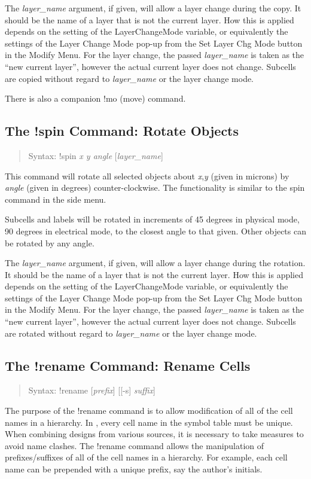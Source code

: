 The {\it layer\_name} argument, if given, will allow a layer change
during the copy.  It should be the name of a layer that is not the
current layer.  How this is applied depends on the setting of the {\et
LayerChangeMode} variable, or equivalently the settings of the {\cb
Layer Change Mode} pop-up from the {\cb Set Layer Chg Mode} button
in the {\cb Modify Menu}.  For the layer change, the passed {\it
layer\_name} is taken as the ``new current layer'', however the actual
current layer does not change.  Subcells are copied without regard to
{\it layer\_name} or the layer change mode.

There is also a companion {\cb !mo} (move) command.

\subsection{The {\cb !spin} Command: Rotate Objects}
\begin{quote}
Syntax: {\vt !spin} {\it x y angle} [{\it layer\_name\/}]
\end{quote}
This command will rotate all selected objects about {\it x\/},{\it y}
(given in microns) by {\it angle} (given in degrees)
counter-clockwise.  The functionality is similar to the {\cb spin}
command in the side menu.

Subcells and labels will be rotated in increments of 45 degrees in
physical mode, 90 degrees in electrical mode, to the closest angle to
that given.  Other objects can be rotated by any angle.

The {\it layer\_name} argument, if given, will allow a layer change
during the rotation.  It should be the name of a layer that is not the
current layer.  How this is applied depends on the setting of the {\et
LayerChangeMode} variable, or equivalently the settings of the {\cb
Layer Change Mode} pop-up from the {\cb Set Layer Chg Mode} button
in the {\cb Modify Menu}.  For the layer change, the passed {\it
layer\_name} is taken as the ``new current layer'', however the actual
current layer does not change.  Subcells are rotated without regard to
{\it layer\_name} or the layer change mode.

\subsection{The {\cb !rename} Command: Rename Cells}
\begin{quote}
Syntax: {\vt !rename} [{\it prefix}] [[-s] {\it suffix}]
\end{quote}
The purpose of the {\cb !rename} command is to allow modification of
all of the cell names in a hierarchy.  In {\Xic}, every cell name in
the symbol table must be unique.  When combining designs from various
sources, it is necessary to take measures to avoid name clashes.  The
{\cb !rename} command allows the manipulation of prefixes/suffixes of
all of the cell names in a hierarchy.  For example, each cell name can
be prepended with a unique prefix, say the author's initials.


